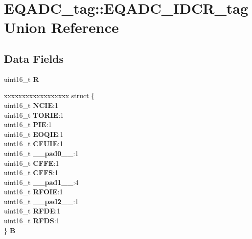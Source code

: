 \hypertarget{unionEQADC__tag_1_1EQADC__IDCR__tag}{}\section{E\+Q\+A\+D\+C\+\_\+tag\+::E\+Q\+A\+D\+C\+\_\+\+I\+D\+C\+R\+\_\+tag Union Reference}
\label{unionEQADC__tag_1_1EQADC__IDCR__tag}
\subsection*{Data Fields}
\begin{DoxyCompactItemize}
\item 
\mbox{\label{unionEQADC__tag_1_1EQADC__IDCR__tag_a1ce35518c7e52532cc282a48e4208a51}} 
uint16\+\_\+t {\bfseries R}
\item 
\mbox{\label{unionEQADC__tag_1_1EQADC__IDCR__tag_ad7c9f5d052f096a16d9aed0bd90bd2aa}} 
\begin{tabbing}
xx\=xx\=xx\=xx\=xx\=xx\=xx\=xx\=xx\=\kill
struct \{\\
\>uint16\_t {\bfseries NCIE}:1\\
\>uint16\_t {\bfseries TORIE}:1\\
\>uint16\_t {\bfseries PIE}:1\\
\>uint16\_t {\bfseries EOQIE}:1\\
\>uint16\_t {\bfseries CFUIE}:1\\
\>uint16\_t {\bfseries \_\_pad0\_\_}:1\\
\>uint16\_t {\bfseries CFFE}:1\\
\>uint16\_t {\bfseries CFFS}:1\\
\>uint16\_t {\bfseries \_\_pad1\_\_}:4\\
\>uint16\_t {\bfseries RFOIE}:1\\
\>uint16\_t {\bfseries \_\_pad2\_\_}:1\\
\>uint16\_t {\bfseries RFDE}:1\\
\>uint16\_t {\bfseries RFDS}:1\\
\} {\bfseries B}\\


\end{tabbing}
\end{DoxyCompactItemize}
